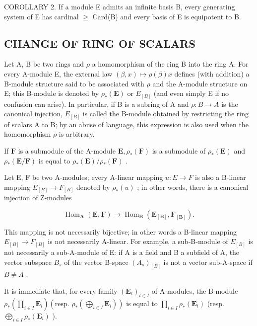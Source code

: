 COROLLARY 2. If a module E admits an infinite basis B, every generating system of E has cardinal \(\geqslant\) Card(B) and every basis of E is equipotent to B.

\subsection{CHANGE OF RING OF SCALARS}

Let A, B be two rings and \(\rho\) a homomorphism of the ring B into the ring A. For every A-module E, the external law \((\beta, x) \mapsto \rho(\beta)x\) defines (with addition) a B-module structure said to be associated with \(\rho\) and the A-module structure on E; this B-module is denoted by \(\rho_{*}(\mathbf{E})\) or \(E_{[B]}\) (and even simply E if no confusion can arise). In particular, if B is a subring of A and \(\rho: B \to A\) is the canonical injection, \(E_{[B]}\) is called the B-module obtained by restricting the ring of scalars A to B; by an abuse of language, this expression is also used when the homomorphism \(\rho\) is arbitrary.

If \(\mathbf{F}\) is a submodule of the A-module \(\mathbf{E},\rho_{*}(\mathbf{F})\) is a submodule of \(\rho_{*}(\mathbf{E})\) and \(\rho_{*}(\mathbf{E} / \mathbf{F})\) is equal to \(\rho_{*}(\mathbf{E}) / \rho_{*}(\mathbf{F})\) .

Let E, F be two A-modules; every A-linear mapping \(u: E \rightarrow F\) is also a B-linear mapping \(E_{[B]} \rightarrow F_{[B]}\) denoted by \(\rho_{*}(u)\) ; in other words, there is a canonical injection of Z-modules

\[
\operatorname{Hom} _ {\mathbf {A}} (\mathbf {E}, \mathbf {F}) \rightarrow \operatorname{Hom} _ {\mathbf {B}} (\mathbf {E} _ {[ \mathbf {B} ]}, \mathbf {F} _ {[ \mathbf {B} ]}).\tag{47}
\]

This mapping is not necessarily bijective; in other words a B-linear mapping \(E_{[B]} \rightarrow F_{[B]}\) is not necessarily A-linear. For example, a sub-B-module of \(E_{[B]}\) is not necessarily a sub-A-module of E: if A is a field and B a subfield of A, the vector subspace \(B_{s}\) of the vector B-space \((A_{s})_{[B]}\) is not a vector sub-A-space if \(B \neq A\) .

It is immediate that, for every family \((\mathbf{E}_t)_{t\in I}\) of A-modules, the B-module \(\rho_{*}\left(\prod_{i\in I}\mathbf{E}_{i}\right)\left(\text{resp. } \rho_{*}\left(\bigoplus_{i\in I}\mathbf{E}_{i}\right)\right)\) is equal to \(\prod_{i\in I}\rho_{*}(\mathbf{E}_{i})\) (resp. \(\bigoplus_{i\in I}\rho_{*}(\mathbf{E}_{i})\) ).

